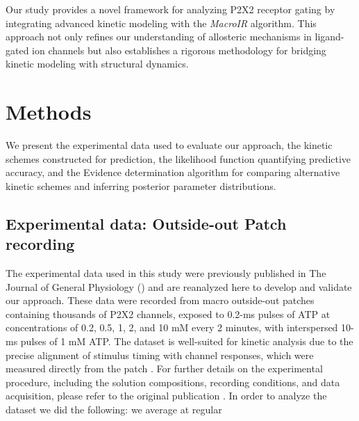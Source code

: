 \documentclass[pdflatex,sn-mathphys-num]{sn-jnl}%
\theoremstyle{thmstyleone}%
\theoremstyle{thmstyletwo}%
\theoremstyle{thmstylethree}%
\begin{document}
Our study provides a novel framework for analyzing P2X2 receptor gating by integrating advanced kinetic modeling with the \textit{MacroIR} algorithm. This approach not only refines our understanding of allosteric mechanisms in ligand-gated ion channels but also establishes a rigorous methodology for bridging kinetic modeling with structural dynamics.  

\section{Methods}\label{sec:methods}
We present the experimental data used to evaluate our approach, the kinetic schemes constructed for prediction, the likelihood function quantifying predictive accuracy, and the Evidence determination algorithm for comparing alternative kinetic schemes and inferring posterior parameter distributions.



\subsection{Experimental data: Outside-out Patch recording}

The experimental data used in this study were previously published in The Journal of General Physiology (\cite{Moffatt_hume}) and are reanalyzed here to develop and validate our approach. These data were recorded from macro outside-out patches containing thousands of P2X2 channels, exposed to 0.2-ms pulses of ATP at concentrations of 0.2, 0.5, 1, 2, and 10 mM every 2 minutes, with interspersed 10-ms pulses of 1 mM ATP. The dataset is well-suited for kinetic analysis due to the precise alignment of stimulus timing with channel responses, which were measured directly from the patch \cite{Moffatt_hume}. For further details on the experimental procedure, including the solution compositions, recording conditions, and data acquisition, please refer to the original publication \cite{Moffatt_hume}.
In order to analyze the dataset we did the following: we average at regular 
\end{document}
